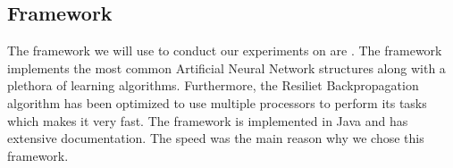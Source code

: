 \subsection{Framework}
The framework we will use to conduct our experiments on are . The framework implements the most common Artificial Neural Network structures along with a plethora of learning algorithms. Furthermore, the Resiliet Backpropagation algorithm has been optimized to use multiple processors to perform its tasks which makes it very fast. The framework is implemented in Java and has extensive documentation. The speed was the main reason why we chose this framework.